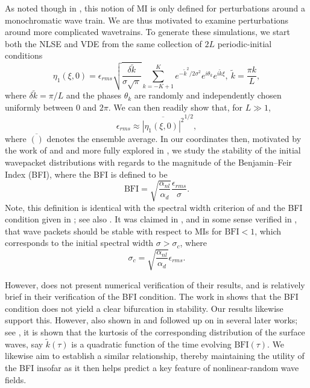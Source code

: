 \documentclass[a4paper,11pt]{article}
\begin{document}
As noted though in \cite{alber}, this notion of MI is only defined for perturbations around a monochromatic wave train.  We are thus motivated to examine perturbations around more complicated wavetrains.  To generate these simulations, we start both the NLSE and VDE from the same collection of $2L$ periodic-initial conditions
\[
\eta_{1}(\xi,0) = \epsilon_{rms}\sqrt{\frac{\delta \tilde{k}}{\sigma\sqrt{\pi}}} \sum_{k=-K+1}^{K}e^{-\tilde{k}^{2}/2\sigma^{2}}e^{i\theta_{k}}e^{i\tilde{k}\xi}, ~ \tilde{k} = \frac{\pi k}{L},
\]
where $\delta \tilde{k}=\pi/L$ and the phases $\theta_{k}$ are randomly and independently chosen uniformly between $0$ and $2\pi$.  We can then readily show that, for $L\gg 1$, 
\[
\epsilon_{rms} \approx \overline{\left|\eta_{1}(\xi,0)\right|^{2}}^{1/2},
\]
where $\overline{()}$ denotes the ensemble average.  In our coordinates then, motivated by the work of \cite{alber} and \cite{dysthe2} and more fully explored in \cite{janssen}, we study the stability of the initial wavepacket distributions with regards to the magnitude of the Benjamin--Feir Index (BFI), where the BFI is defined to be  
\[
\mbox{BFI} = \sqrt{\frac{\alpha_{nl}}{\alpha_{d}}}\frac{\epsilon_{rms}}{\sigma}.
\]
Note, this definition is identical with the spectral width criterion of \cite{alber} and the BFI condition given in \cite{thomas2012nonlinear}; see also \cite{onorato}.  It was claimed in \cite{alber}, and in some sense verified in \cite{dysthe2}, that wave packets should be stable with respect to MIs for $\mbox{BFI}<1$, which corresponds to the initial spectral width $\sigma>\sigma_{c}$, where 
\[
\sigma_{c} = \sqrt{\frac{\alpha_{nl}}{\alpha_{d}}}\epsilon_{rms}.
\]

However, \cite{alber} does not present numerical verification of their results, and \cite{dysthe2} is relatively brief in their verification of the BFI condition.  The work in \cite{janssen} shows that the BFI condition does not yield a clear bifurcation in stability.  Our results likewise support this.  However, also shown in \cite{janssen} and followed up on in several later works; see \cite{onorato,slunyaev,eeltink}, it is shown that the kurtosis of the corresponding distribution of the surface waves, say $\tilde{k}(\tau)$ is a quadratic function of the time evolving $\mbox{BFI}(\tau)$.   We likewise aim to establish a similar relationship, thereby maintaining the utility of the BFI insofar as it then helps predict a key feature of nonlinear-random wave fields. 
\end{document}
